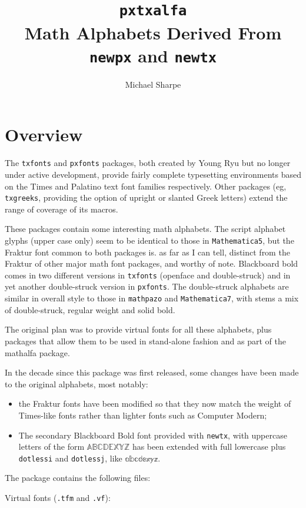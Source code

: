 \documentclass[11pt]{article}
\title{{\tt\Large pxtxalfa}\\Math Alphabets Derived From {\tt\Large newpx} and {\tt\Large newtx}}
\author{Michael Sharpe}
\begin{document}
\maketitle
\section{Overview}
The {\tt txfonts} and {\tt pxfonts} packages, both created by Young Ryu but no longer under  active development, provide fairly complete typesetting environments based on the Times and Palatino text font families respectively. Other packages (eg, {\tt txgreeks}, providing the option of upright or slanted Greek letters) extend the range of coverage of its macros. 

These packages contain some interesting math alphabets. The script alphabet glyphs (upper case only) seem to be identical to those in {\tt Mathematica5}, but the Fraktur font common to both packages is. as far as I can tell,  distinct from the Fraktur of other major math font packages, and worthy of note. Blackboard bold comes in two different versions in {\tt txfonts} (openface and double-struck) and in yet another double-struck version in {\tt pxfonts}. The double-struck alphabets are similar in overall style to those in {\tt mathpazo} and {\tt Mathematica7}, with stems a mix of double-struck, regular weight  and solid bold.


The original plan was to provide virtual fonts for all these alphabets, plus packages that allow them to be used in stand-alone fashion and as part of the \textsf{mathalfa} package.

In the decade since this package was first released, some changes have been made to the original alphabets, most notably:
\begin{itemize}
\item
the Fraktur fonts have been modified so that they now match the weight of Times-like fonts rather than lighter fonts such as Computer Modern;
\item The secondary Blackboard Bold font provided with {\tt newtx}, with uppercase letters of the form $\mathbb{ABCDEXYZ}$ has been extended with full lowercase plus {\tt dotlessi} and {\tt dotlessj}, like $\mathbb{abcdexyz}$.
\end{itemize}


The package contains the following files: 

Virtual fonts ({\tt.tfm} and {\tt.vf}):
\end{document}
